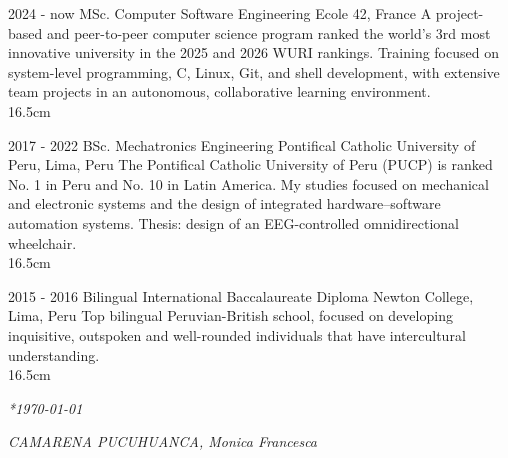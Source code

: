 \documentclass[]{friggeri-cv}
\begin{document}
\begin{entrylist}

  \entrywide
    {2024 - now}
    {\vspace*{0.6em}MSc. Computer Software Engineering}
    {Ecole 42, France}
    {A project-based and peer-to-peer computer science program ranked the world's 3rd most innovative university in the 2025 and 2026 WURI rankings. Training focused on system-level programming, C, Linux, Git, and shell development, with extensive team projects in an autonomous, collaborative learning environment.\\}
    {16.5cm}

  \entrywide
    {2017 - 2022}
    {\vspace*{0.6em}BSc. Mechatronics Engineering}
    {Pontifical Catholic University of Peru, Lima, Peru}
    {The Pontifical Catholic University of Peru (PUCP) is ranked No. 1 in Peru and No. 10 in Latin America. My studies focused on mechanical and electronic systems and the design of integrated hardware--software automation systems. Thesis: design of an EEG-controlled omnidirectional wheelchair.\\}
    {16.5cm}

  \entrywide
    {2015 - 2016}
    {\vspace*{0.6em}Bilingual International Baccalaureate Diploma}
    {Newton College, Lima, Peru}
    {Top bilingual Peruvian-British school, focused on developing inquisitive, outspoken and well-rounded individuals that have intercultural understanding.\\}
    {16.5cm}

\end{entrylist}



\begin{flushleft}

\emph{*\today*}

\end{flushleft}

\vspace{-8mm}

\begin{flushright}

\emph{CAMARENA PUCUHUANCA, Monica Francesca}

\end{flushright}

\clearpage

\restoregeometry


\end{document}
